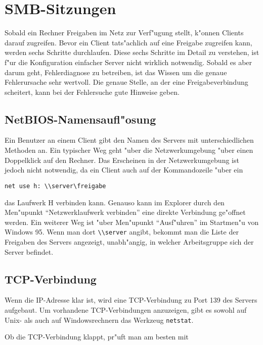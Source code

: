\documentclass{scrartcl}\usepackage{pslatex}\typearea{12}
\newcommand{\prog}{\texttt}
\begin{document}
\section{SMB-Sitzungen}
\label{smb-sitzungen}

Sobald ein Rechner Freigaben im Netz zur Verf"ugung stellt, k"onnen
Clients darauf zugreifen. Bevor ein Client tats"achlich auf eine
Freigabe zugreifen kann, werden sechs Schritte durchlaufen. Diese
sechs Schritte im Detail zu verstehen, ist f"ur die Konfiguration
einfacher Server nicht wirklich notwendig. Sobald es aber darum geht,
Fehlerdiagnose zu betreiben, ist das Wissen um die genaue
Fehlerursache sehr wertvoll. Die genaue Stelle, an der eine
Freigabeverbindung scheitert, kann bei der Fehlersuche gute Hinweise
geben.

\subsection{NetBIOS-Namensaufl"osung}

Ein Benutzer an einem Client gibt den Namen des Servers mit
unterschiedlichen Methoden an. Ein typischer Weg geht "uber die
Netzwerkumgebung "uber einen Doppelklick auf den Rechner. Das
Erscheinen in der Netzwerkumgebung ist jedoch nicht notwendig, da ein
Client auch auf der Kommandozeile "uber ein

\begin{verbatim}
net use h: \\server\freigabe
\end{verbatim}

\noindent das Laufwerk H verbinden kann. Genauso kann im Explorer durch den
Men"upunkt "`Netzwerklaufwerk verbinden"' eine direkte Verbindung
ge"offnet werden. Ein weiterer Weg ist "uber Men"upunkt "`Ausf"uhren"'
im Startmen"u von Windows 95. Wenn man dort \verb|\\server| angibt,
bekommt man die Liste der Freigaben des Servers angezeigt,
unabh"angig, in welcher Arbeitsgruppe sich der Server befindet.

\subsection{TCP-Verbindung}

Wenn die IP-Adresse klar ist, wird eine TCP-Verbindung zu Port 139 des
Servers aufgebaut. Um vorhandene TCP-Verbindungen anzuzeigen, gibt es
sowohl auf Unix- als auch auf Windowsrechnern das Werkzeug
\prog{netstat}.

Ob die TCP-Verbindung klappt, pr"uft man am besten mit
\end{document}
